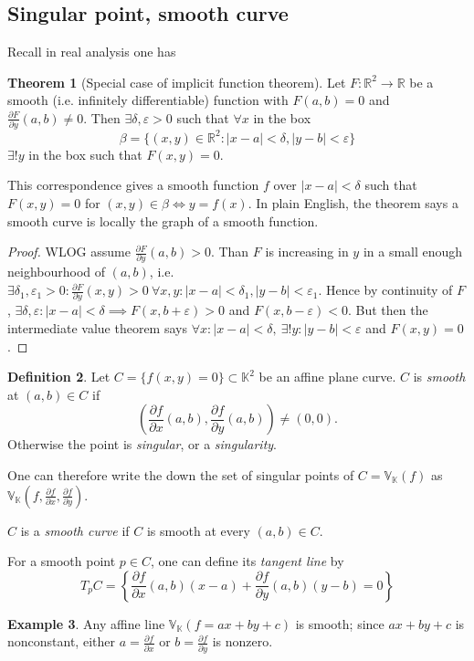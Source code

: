 \documentclass{article}
\newcommand{\R}{\mathbb{R}}
\newcommand{\K}{\mathbb{K}}
\newcommand{\V}{\mathbb{V}}
\theoremstyle{definition}
\newtheorem{defn}{Definition}[subsection]
\newtheorem{thm}[defn]{Theorem}
\newtheorem{example}[defn]{Example}
\begin{document}
\subsection{Singular point, smooth curve}
Recall in real analysis one has
\begin{thm}[Special case of implicit function theorem]
Let $F:\R^2\rightarrow\R$ be a smooth (i.e. infinitely differentiable) function with $F(a,b)=0$ and $\frac{\partial F}{\partial y}(a,b)\neq 0$. Then $\exists \delta,\varepsilon>0$ such that $\forall x$ in the box
\[
\beta=\{(x,y)\in\R^2:|x-a|<\delta,|y-b|<\varepsilon\}
\]
$\exists! y$ in the box such that $F(x,y)=0$.

This correspondence gives a smooth function $f$ over $|x-a|<\delta$ such that $F(x,y)=0$ for $(x,y)\in\beta\iff y=f(x)$. In plain English, the theorem says a smooth curve is locally the graph of a smooth function.
\end{thm}
\begin{proof}
WLOG assume $\frac{\partial F}{\partial y}(a,b)>0$. Than $F$ is increasing in $y$ in a small enough neighbourhood of $(a,b)$, i.e. $\exists\delta_1,\varepsilon_1>0:\frac{\partial F}{\partial y}(x,y)>0 \ \forall x,y:|x-a|<\delta_1,|y-b|<\varepsilon_1$. Hence by continuity of $F$, $\exists\delta,\varepsilon:|x-a|<\delta\implies F(x,b+\varepsilon)>0$ and $F(x,b-\varepsilon)<0$. But then the intermediate value theorem says $\forall x:|x-a|<\delta,\ \exists!y:|y-b|<\varepsilon$ and $F(x,y)=0$.
\end{proof}

\begin{defn}
Let $C=\{f(x,y)=0\}\subset\K^2$ be an affine plane curve. $C$ is \textit{smooth} at $(a,b)\in C$ if
\[
\left(\frac{\partial f}{\partial x}(a,b),\frac{\partial f}{\partial y}(a,b)\right)\neq (0,0).
\]
Otherwise the point is \textit{singular}, or a \textit{singularity}.

One can therefore write the down the set of singular points of $C=\V_\K(f)$ as $\V_\K\left(f,\frac{\partial f}{\partial x},\frac{\partial f}{\partial y}\right)$.

$C$ is a \textit{smooth curve} if $C$ is smooth at every $(a,b)\in C$.

For a smooth point $p\in C$, one can define its \textit{tangent line} by
\[
T_pC=\left\{\frac{\partial f}{\partial x}(a,b)(x-a)+\frac{\partial f}{\partial y}(a,b)(y-b)=0\right\}
\]
\end{defn}
\begin{example}
Any affine line $\V_\K(f=ax+by+c)$ is smooth; since $ax+by+c$ is nonconstant, either $a=\frac{\partial f}{\partial x}$ or $b=\frac{\partial f}{\partial y}$ is nonzero.
\end{example}
\end{document}
